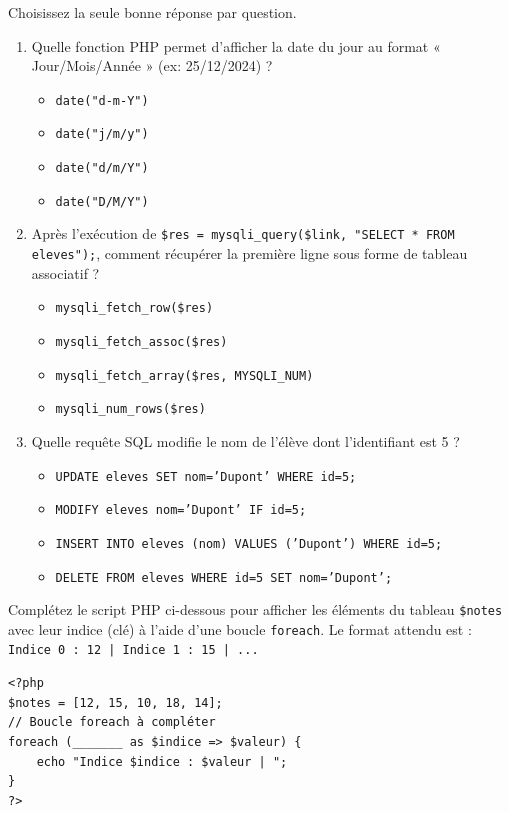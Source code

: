 \documentclass[11pt]{article}
\begin{document}
\begin{exercice}
Choisissez la seule bonne réponse par question.
\begin{enumerate}
    \item Quelle fonction PHP permet d'afficher la date du jour au format « Jour/Mois/Année » (ex: 25/12/2024) ?
    \begin{itemize}
        \item \texttt{date("d-m-Y")}
        \item \texttt{date("j/m/y")}
        \item \texttt{date("d/m/Y")}
        \item \texttt{date("D/M/Y")}
    \end{itemize}
    \item Après l'exécution de \texttt{\$res = mysqli\_query(\$link, "SELECT * FROM eleves");}, comment récupérer la première ligne sous forme de tableau associatif ?
    \begin{itemize}
        \item \texttt{mysqli\_fetch\_row(\$res)}
        \item \texttt{mysqli\_fetch\_assoc(\$res)}
        \item \texttt{mysqli\_fetch\_array(\$res, MYSQLI\_NUM)}
        \item \texttt{mysqli\_num\_rows(\$res)}
    \end{itemize}
    \item Quelle requête SQL modifie le nom de l'élève dont l'identifiant est 5 ?
    \begin{itemize}
        \item \texttt{UPDATE eleves SET nom='Dupont' WHERE id=5;}
        \item \texttt{MODIFY eleves nom='Dupont' IF id=5;}
        \item \texttt{INSERT INTO eleves (nom) VALUES ('Dupont') WHERE id=5;}
        \item \texttt{DELETE FROM eleves WHERE id=5 SET nom='Dupont';}
    \end{itemize}
\end{enumerate}
\end{exercice}

\begin{exercice}
Complétez le script PHP ci-dessous pour afficher les éléments du tableau \texttt{\$notes} avec leur indice (clé) à l'aide d'une boucle \texttt{foreach}. Le format attendu est : \texttt{Indice 0 : 12 | Indice 1 : 15 | ...}
\begin{verbatim}
<?php
$notes = [12, 15, 10, 18, 14];
// Boucle foreach à compléter
foreach (_______ as $indice => $valeur) {
    echo "Indice $indice : $valeur | ";
}
?>
\end{verbatim}
\end{exercice}
\end{document}
